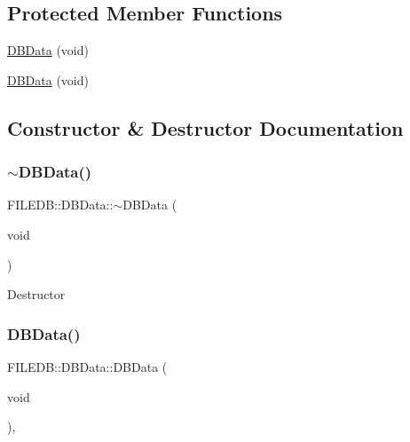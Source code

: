 \subsection*{Protected Member Functions}
\begin{DoxyCompactItemize}
\item 
\mbox{\hyperlink{classFILEDB_1_1DBData_a81662e20dfe472b9c56ec1e9ff8278fc}{D\+B\+Data}} (void)
\item 
\mbox{\hyperlink{classFILEDB_1_1DBData_a81662e20dfe472b9c56ec1e9ff8278fc}{D\+B\+Data}} (void)
\end{DoxyCompactItemize}


\subsection{Constructor \& Destructor Documentation}
\mbox{\label{classFILEDB_1_1DBData_afb154d074a887601e48853bb5b7089b5}} 
\subsubsection{\texorpdfstring{$\sim$DBData()}{~DBData()}\hspace{0.1cm}{\footnotesize\ttfamily [1/2]}}
{\footnotesize\ttfamily F\+I\+L\+E\+D\+B\+::\+D\+B\+Data\+::$\sim$\+D\+B\+Data (\begin{DoxyParamCaption}\item[{void}]{ }\end{DoxyParamCaption})\hspace{0.3cm}{\ttfamily [inline]}}

Destructor \mbox{\label{classFILEDB_1_1DBData_a81662e20dfe472b9c56ec1e9ff8278fc}} 
\subsubsection{\texorpdfstring{DBData()}{DBData()}\hspace{0.1cm}{\footnotesize\ttfamily [1/2]}}
{\footnotesize\ttfamily F\+I\+L\+E\+D\+B\+::\+D\+B\+Data\+::\+D\+B\+Data (\begin{DoxyParamCaption}\item[{void}]{ }\end{DoxyParamCaption})\hspace{0.3cm}{\ttfamily [inline]}, {\ttfamily [protected]}}

